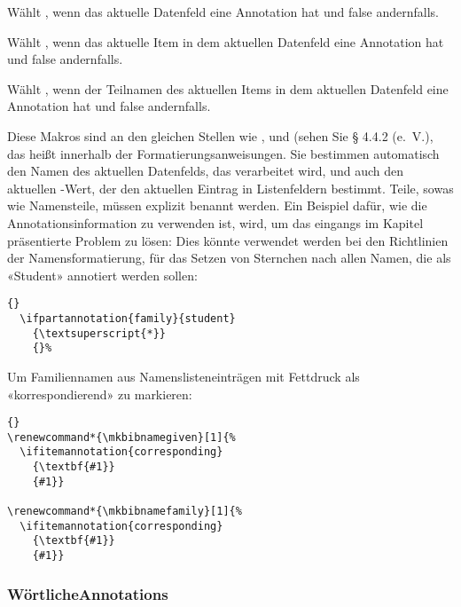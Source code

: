 \documentclass{ltxdockit}[2011/03/25]
\begin{document}
\begin{ltxsyntax}


Wählt , wenn das aktuelle Datenfeld eine Annotation hat  und 
false andernfalls.


Wählt , wenn das aktuelle Item in dem aktuellen Datenfeld eine 
Annotation hat  und false andernfalls.  


Wählt , wenn der Teilnamen  des aktuellen Items in dem 
aktuellen Datenfeld eine 
Annotation hat  und false andernfalls.

\end{ltxsyntax}
%
Diese Makros sind an den gleichen Stellen wie ,  
und  (sehen Sie § 4.4.2 (e.~V.), %
das heißt innerhalb der
Formatierungsanweisungen. Sie bestimmen automatisch den Namen des aktuellen 
Datenfelds, das verarbeitet wird, und auch den aktuellen -Wert, der den aktuellen Eintrag in Listenfeldern bestimmt.  Teile, sowas wie Namensteile, müssen explizit benannt werden. Ein Beispiel dafür, wie die Annotationsinformation zu verwenden ist,
wird, um das eingangs im Kapitel präsentierte Problem zu lösen: Dies könnte verwendet werden bei den Richtlinien der Namensformatierung, für das Setzen von Sternchen nach allen Namen, die als  «Student» annotiert werden sollen:

\begin{lstlisting}[style=latex]{}
  \ifpartannotation{family}{student}
    {\textsuperscript{*}}
    {}%
\end{lstlisting}
%
Um  Familiennamen aus Namenslisteneinträgen mit Fettdruck als «korrespondierend» 
zu markieren:

\begin{lstlisting}[style=latex]{}
\renewcommand*{\mkbibnamegiven}[1]{%
  \ifitemannotation{corresponding}
    {\textbf{#1}}
    {#1}}

\renewcommand*{\mkbibnamefamily}[1]{%
  \ifitemannotation{corresponding}
    {\textbf{#1}}
    {#1}}
\end{lstlisting}

\subsubsection{Wörtliche\newline Annotations}
\end{document}
